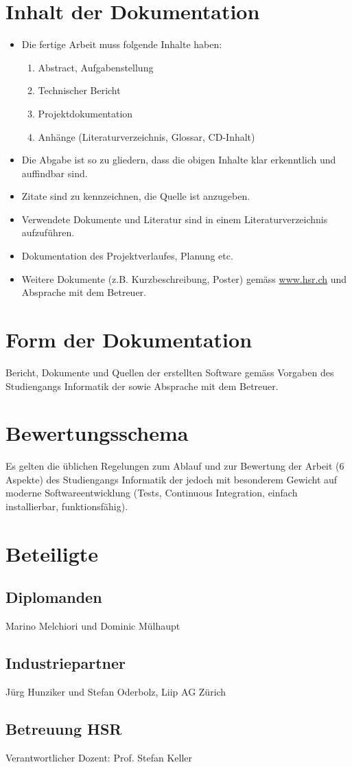 \section*{Inhalt der Dokumentation}
\begin{itemize}
	\item Die fertige Arbeit muss folgende Inhalte haben:
	\begin{enumerate}
		\item Abstract, Aufgabenstellung
		\item Technischer Bericht
		\item Projektdokumentation
		\item Anhänge (Literaturverzeichnis, Glossar, CD-Inhalt)
	\end{enumerate}
	\item Die Abgabe ist so zu gliedern, dass die obigen Inhalte klar erkenntlich und auffindbar sind.
	\item Zitate sind zu kennzeichnen, die Quelle ist anzugeben.
	\item Verwendete Dokumente und Literatur sind in einem Literaturverzeichnis aufzuführen.
	\item Dokumentation des Projektverlaufes, Planung etc.
	\item Weitere Dokumente (z.B. Kurzbeschreibung, Poster) gemäss \url{www.hsr.ch} und Absprache mit dem Betreuer.
\end{itemize}

\section*{Form der Dokumentation}
Bericht, Dokumente und Quellen der erstellten Software gemäss Vorgaben des Studiengangs Informatik der  sowie Absprache mit dem Betreuer.

\section*{Bewertungsschema}
Es gelten die üblichen Regelungen zum Ablauf und zur Bewertung der Arbeit (6 Aspekte) des Studiengangs Informatik der  jedoch mit besonderem Gewicht auf moderne Softwareentwicklung (Tests, Continuous Integration, einfach installierbar, funktionsfähig).

\section*{Beteiligte}
\subsection*{Diplomanden}
Marino Melchiori und Dominic Mülhaupt

\subsection*{Industriepartner}
Jürg Hunziker und Stefan Oderbolz, Liip AG Zürich

\subsection*{Betreuung HSR}
Verantwortlicher Dozent: Prof. Stefan Keller